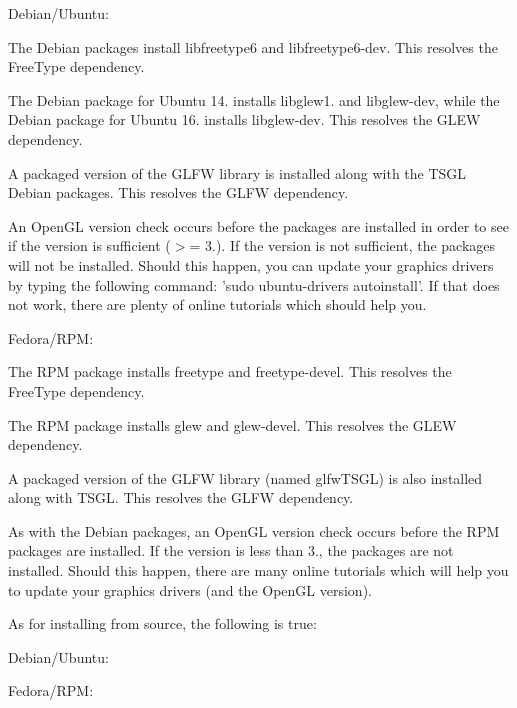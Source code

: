 \begin{DoxyItemize}
\item Debian/\-Ubuntu\-:
\begin{DoxyItemize}
\item The Debian packages install libfreetype6 and libfreetype6-\/dev. This resolves the Free\-Type dependency.
\item The Debian package for Ubuntu 14. installs libglew1. and libglew-\/dev, while the Debian package for Ubuntu 16. installs libglew-\/dev. This resolves the G\-L\-E\-W dependency.
\item A packaged version of the G\-L\-F\-W library is installed along with the T\-S\-G\-L Debian packages. This resolves the G\-L\-F\-W dependency.
\item An Open\-G\-L version check occurs before the packages are installed in order to see if the version is sufficient ($>$= 3.). If the version is not sufficient, the packages will not be installed. Should this happen, you can update your graphics drivers by typing the following command\-: 'sudo ubuntu-\/drivers autoinstall'. If that does not work, there are plenty of online tutorials which should help you.
\end{DoxyItemize}
\item Fedora/\-R\-P\-M\-:
\begin{DoxyItemize}
\item The R\-P\-M package installs freetype and freetype-\/devel. This resolves the Free\-Type dependency.
\item The R\-P\-M package installs glew and glew-\/devel. This resolves the G\-L\-E\-W dependency.
\item A packaged version of the G\-L\-F\-W library (named glfw\-T\-S\-G\-L) is also installed along with T\-S\-G\-L. This resolves the G\-L\-F\-W dependency.
\item As with the Debian packages, an Open\-G\-L version check occurs before the R\-P\-M packages are installed. If the version is less than 3., the packages are not installed. Should this happen, there are many online tutorials which will help you to update your graphics drivers (and the Open\-G\-L version).
\end{DoxyItemize}
\end{DoxyItemize}

As for installing from source, the following is true\-:


\begin{DoxyItemize}
\item Debian/\-Ubuntu\-:
\begin{DoxyItemize}
\item 
\end{DoxyItemize}
\item Fedora/\-R\-P\-M\-:
\begin{DoxyItemize}
\item 
\end{DoxyItemize}
\end{DoxyItemize}

